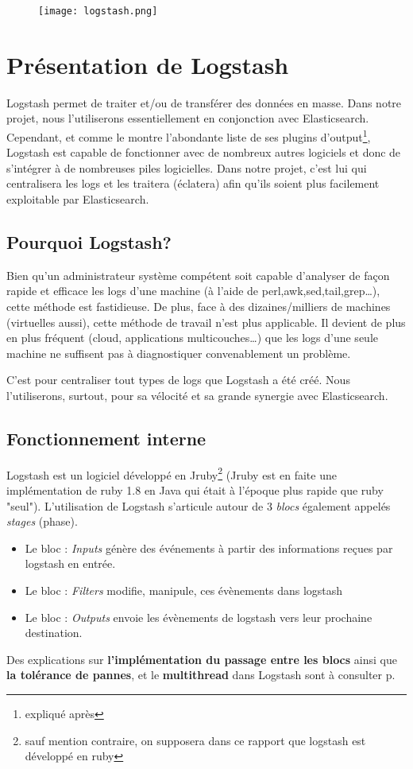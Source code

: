 \begin{figure}[H]
\center
\texttt{[image: logstash.png]}
\label{fig:logstashlogo.png}
\end{figure}
\section{Présentation de Logstash}

Logstash permet de traiter et/ou de transférer des données en masse. Dans notre 
projet, nous l'utiliserons essentiellement en conjonction avec Elasticsearch. 
Cependant, et comme le montre l'abondante liste de ses plugins d'output\footnote{expliqué
après}, Logstash est capable de fonctionner avec de nombreux autres logiciels et donc
de s'intégrer à de nombreuses piles logicielles.
Dans notre projet, c'est lui qui centralisera les \gls{logs} et les traitera (éclatera)
afin qu'ils soient plus facilement exploitable par Elasticsearch.


\subsection{Pourquoi Logstash?}
Bien qu'un administrateur système compétent soit capable d'analyser de façon rapide 
et efficace les logs d'une machine (à l'aide de perl,awk,sed,tail,grep\ldots), cette méthode
est fastidieuse. De plus, face à des dizaines/milliers de machines (virtuelles aussi), 
cette méthode de travail n'est plus applicable.
Il devient de plus en plus fréquent (cloud, applications multicouches\ldots) 
que les logs d'une seule machine ne suffisent pas à diagnostiquer convenablement un 
problème.

C'est pour centraliser tout types de \gls{logs} que Logstash a été créé. Nous
l'utiliserons, surtout, pour sa vélocité et sa grande synergie avec Elasticsearch.

\subsection{Fonctionnement interne}
Logstash est un logiciel développé en Jruby\footnote{sauf mention contraire, on supposera
dans ce rapport que logstash est développé en ruby} (Jruby est en faite une implémentation
de ruby 1.8 en Java qui était à l'époque plus rapide que ruby "seul"). 
L'utilisation de Logstash s'articule autour de 3 \emph{blocs} 
également appelés \emph{stages} (phase).
\begin{itemize}
    \item   Le bloc : \emph{Inputs} génère des événements à partir des informations reçues
    par logstash en entrée.
    \item   Le bloc : \emph{Filters} modifie, manipule, ces évènements dans logstash
    \item   Le bloc : \emph{Outputs} envoie les évènements de logstash vers leur 
    prochaine destination.
\end{itemize}
Des explications sur \textbf{l'implémentation du passage entre les blocs} ainsi que
\textbf{la tolérance de pannes}, et le\textbf{ multithread} dans Logstash sont à 
consulter p\pageref{subsec:passageinterbloc}.\\[2mm]

